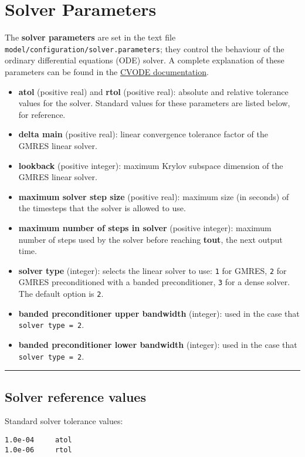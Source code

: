 \section{Solver Parameters} \label{sec:solver}

The \textbf{solver parameters} are set in the text file
\texttt{model/configuration/solver.parameters}; they control the
behaviour of the ordinary differential equations (ODE) solver. A
complete explanation of these parameters can be found in the
\href{https://computation.llnl.gov/projects/sundials/sundials-software}{CVODE
documentation}.

\begin{itemize}
\item
  \textbf{atol} (positive real) and \textbf{rtol} (positive real):
  absolute and relative tolerance values for the solver. Standard values
  for these parameters are listed below, for reference.
\item
  \textbf{delta main} (positive real): linear convergence tolerance
  factor of the GMRES linear solver.
\item
  \textbf{lookback} (positive integer): maximum Krylov subspace
  dimension of the GMRES linear solver.
\item
  \textbf{maximum solver step size} (positive real): maximum size (in
  seconds) of the timesteps that the solver is allowed to use.
\item
  \textbf{maximum number of steps in solver} (positive integer): maximum
  number of steps used by the solver before reaching \textbf{tout}, the
  next output time.
\item
  \textbf{solver type} (integer): selects the linear solver to use:
  \texttt{1} for GMRES, \texttt{2} for GMRES preconditioned with a
  banded preconditioner, \texttt{3} for a dense solver. The default
  option is \texttt{2}.
\item
  \textbf{banded preconditioner upper bandwidth} (integer): used in the
  case that \texttt{solver\ type\ =\ 2}.
\item
  \textbf{banded preconditioner lower bandwidth} (integer): used in the
  case that \texttt{solver\ type\ =\ 2}.
\end{itemize}

\begin{center}\rule{0.5\linewidth}{\linethickness}\end{center}

\hypertarget{solver-reference-values}{%
\subsection{Solver reference values}\label{solver-reference-values}}

Standard solver tolerance values:

\begin{verbatim}
1.0e-04     atol
1.0e-06     rtol
\end{verbatim}
